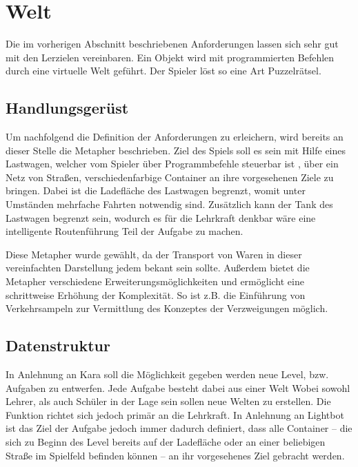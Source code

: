 \section{Welt}
\label{sec:requirements:world}

Die im vorherigen Abschnitt beschriebenen Anforderungen lassen sich sehr gut mit den Lerzielen vereinbaren. Ein Objekt wird mit programmierten Befehlen durch eine virtuelle Welt geführt. Der Spieler löst so eine Art Puzzelrätsel.

\subsection{Handlungsgerüst}
\label{sec:requirements:world:metaphor}

Um nachfolgend die Definition der Anforderungen zu erleichern, wird bereits an dieser Stelle die Metapher beschrieben. Ziel des Spiels soll es sein mit Hilfe eines Lastwagen, welcher vom Spieler über Programmbefehle steuerbar ist , über ein Netz von Straßen, verschiedenfarbige Container an ihre vorgesehenen Ziele zu bringen. Dabei ist die Ladefläche des Lastwagen begrenzt, womit unter Umständen mehrfache Fahrten notwendig sind. Zusätzlich kann der Tank des Lastwagen begrenzt sein, wodurch es für die Lehrkraft denkbar wäre eine intelligente Routenführung Teil der Aufgabe zu machen.

Diese Metapher wurde gewählt, da der Transport von Waren in dieser vereinfachten Darstellung jedem bekant sein sollte. Außerdem bietet die Metapher verschiedene Erweiterungsmöglichkeiten und ermöglicht eine schrittweise Erhöhung der Komplexität. So ist z.B. die Einführung von Verkehrsampeln zur Vermittlung des Konzeptes der Verzweigungen möglich.

\subsection{Datenstruktur}
\label{sec:requirements:world:structure}

In Anlehnung an Kara soll die Möglichkeit gegeben werden neue Level, bzw. Aufgaben zu entwerfen. Jede Aufgabe besteht dabei aus einer Welt Wobei sowohl Lehrer, als auch Schüler in der Lage sein sollen neue Welten zu erstellen. Die Funktion richtet sich jedoch primär an die Lehrkraft. In Anlehnung an Lightbot ist das Ziel der Aufgabe jedoch immer dadurch definiert, dass alle Container -- die sich zu Beginn des Level bereits auf der Ladefläche oder an einer beliebigen Straße im Spielfeld befinden können -- an ihr vorgesehenes Ziel gebracht werden.


